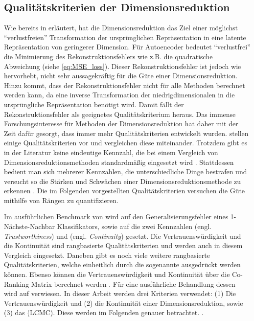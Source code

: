 \subsection{Qualitätskriterien der Dimensionsreduktion}
\label{ch:Vergleich:sec:Methodik:subsec:Qualitaetskriterien}
Wie bereits in  erläutert, hat die Dimensionsreduktion das Ziel einer möglichst \enquote{verlustfreien} Transformation der ursprünglichen Repräsentation in eine latente Repräsentation von geringerer Dimension. Für Autoencoder bedeutet \enquote{verlustfrei} die Minimierung des Rekonstruktionsfehlers wie z.B. die quadratische Abweichung (siehe \eqref{eq:MSE_loss}). Dieser Rekonstruktionsfehler ist jedoch wie \textcite[18]{vanderMaaten.2009} hervorhebt, nicht sehr aussagekräftig für die Güte einer Dimensionsreduktion. Hinzu kommt, dass der Rekonstruktionsfehler nicht für alle Methoden berechnet werden kann, da eine inverse Transformation der niedrigdimensionalen in die ursprüngliche Repräsentation benötigt wird. Damit fällt der Rekonstruktionsfehler als geeignetes Qualitätskriterium heraus. Das immense Forschungsinteresse für Methoden der Dimensionsreduktion hat daher mit der Zeit dafür gesorgt, dass immer mehr Qualitätskriterien entwickelt wurden. \textcite{Gracia.2014} stellen einige Qualitätskriterien vor und vergleichen diese miteinander. Trotzdem gibt es in der Literatur keine eindeutige Kennzahl, die bei einem Vergleich von Dimensionsreduktionsmethoden standardmäßig eingesetzt wird \parencite[vgl.][1 -- 2]{Lee.2009}. Stattdessen bedient man sich mehrerer Kennzahlen, die
unterschiedliche Dinge bestrafen und versucht so die Stärken und Schwächen einer
Dimensionsreduktionsmethode zu erkennen \parencite[486]{Venna.2001}. Die im Folgenden vorgestellten Qualitätskriterien versuchen die Güte
mithilfe von Rängen zu quantifizieren.

Im ausführlichen Benchmark von \textcite{vanderMaaten.2009} wird auf den Generalisierungsfehler
eines 1-Nächste-Nachbar Klassifikators, sowie auf die zwei Kennzahlen
 (engl. \textit{Trustworthiness}) und  (engl.
\textit{Continuity}) \parencites{Venna.2001}{Venna.2006} gesetzt. Die Vertrauenswürdigkeit und die Kontinuität sind
rangbasierte Qualitätskriterien und werden auch in diesem Vergleich eingesetzt. Daneben gibt es
noch viele weitere rangbasierte Qualitätskriterien, welche einheitlich durch die sogenannte
 \parencite[1432]{Lee.2009} ausgedrückt werden können. Ebenso können die Vertrauenswürdigkeit und
Kontinuität über die Co-Ranking Matrix berechnet werden \parencite[1433]{Lee.2009}. Für eine ausführliche Behandlung dessen wird auf \textcite{Lee.2009}
verwiesen. In dieser Arbeit werden drei Kriterien verwendet: (1) Die Vertrauenswürdigkeit und (2)
die Kontinuität einer Dimensionsreduktion, sowie (3) das 
(LCMC). Diese werden im Folgenden genauer betrachtet. .
